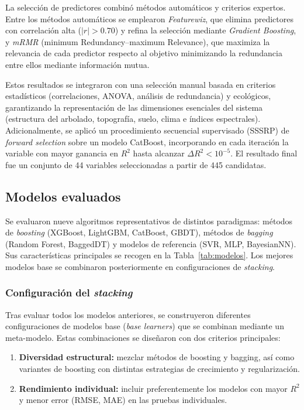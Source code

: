 La selección de predictores combinó métodos automáticos y criterios expertos. Entre los métodos automáticos se emplearon \textit{Featurewiz}, que elimina predictores con correlación alta ($|r|>0.70$) y refina la selección mediante \textit{Gradient Boosting}, y \textit{mRMR} (minimum Redundancy–maximum Relevance), que maximiza la relevancia de cada predictor respecto al objetivo minimizando la redundancia entre ellos mediante información mutua.

Estos resultados se integraron con una selección manual basada en criterios estadísticos (correlaciones, ANOVA, análisis de redundancia) y ecológicos, garantizando la representación de las dimensiones esenciales del sistema (estructura del arbolado, topografía, suelo, clima e índices espectrales). Adicionalmente, se aplicó un procedimiento secuencial supervisado (SSSRP) de \textit{forward selection} sobre un modelo CatBoost, incorporando en cada iteración la variable con mayor ganancia en $R^2$ hasta alcanzar $\Delta R^2 < 10^{-5}$. El resultado final fue un conjunto de 44 variables seleccionadas a partir de 445 candidatas.

\subsection{Modelos evaluados}\label{subsec:modelosevaluados}

Se evaluaron nueve algoritmos representativos de distintos paradigmas: métodos de \textit{boosting} (XGBoost, LightGBM, CatBoost, GBDT), métodos de \textit{bagging} (Random Forest, BaggedDT) y modelos de referencia (SVR, MLP, BayesianNN). Sus características principales se recogen en la Tabla~\ref{tab:modelos}. Los mejores modelos base se combinaron posteriormente en configuraciones de \textit{stacking}.

\subsubsection{Configuración del \textit{stacking}}

Tras evaluar todos los modelos anteriores, se construyeron diferentes configuraciones de modelos base (\textit{base learners}) que se combinan mediante un meta-modelo. Estas combinaciones se diseñaron con dos criterios principales:

\begin{enumerate}
    \item \textbf{Diversidad estructural:} mezclar métodos de boosting y bagging, así como variantes de boosting con distintas estrategias de crecimiento y regularización.
    \item \textbf{Rendimiento individual:} incluir preferentemente los modelos con mayor $R^2$ y menor error (RMSE, MAE) en las pruebas individuales.
\end{enumerate}

